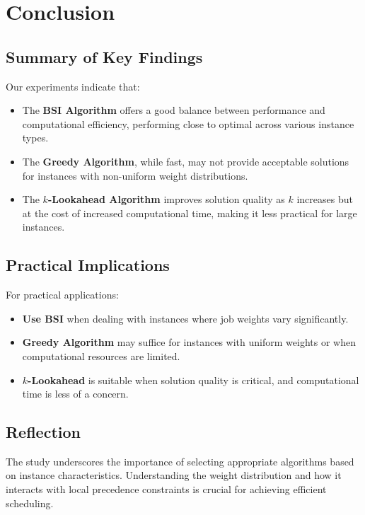 \section{Conclusion}

\subsection*{Summary of Key Findings}

Our experiments indicate that:

\begin{itemize}
    \item The \textbf{BSI Algorithm} offers a good balance between performance and computational efficiency, performing close to optimal across various instance types.
    \item The \textbf{Greedy Algorithm}, while fast, may not provide acceptable solutions for instances with non-uniform weight distributions.
    \item The \textbf{$k$-Lookahead Algorithm} improves solution quality as $k$ increases but at the cost of increased computational time, making it less practical for large instances.
\end{itemize}

\subsection*{Practical Implications}

For practical applications:

\begin{itemize}
    \item \textbf{Use BSI} when dealing with instances where job weights vary significantly.
    \item \textbf{Greedy Algorithm} may suffice for instances with uniform weights or when computational resources are limited.
    \item \textbf{$k$-Lookahead} is suitable when solution quality is critical, and computational time is less of a concern.
\end{itemize}

\subsection*{Reflection}

The study underscores the importance of selecting appropriate algorithms based on instance characteristics. Understanding the weight distribution and how it interacts with local precedence constraints is crucial for achieving efficient scheduling.